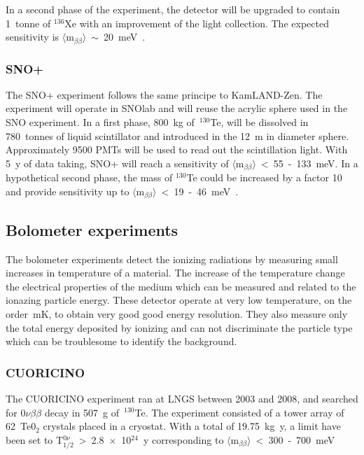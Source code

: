 \documentclass[main.tex]{subfiles}
\begin{document}
\NI In a second phase of the experiment, the detector will be upgraded to contain 1~tonne of $^{\text{136}}$Xe with an improvement of the light collection. The expected sensitivity is $\langle \text{m}_{\beta\beta} \rangle$~$\sim$~20~meV~\cite{KamLAND-Zen3}.


\FloatBarrier


\subsubsection{SNO+}


\NI The SNO+ experiment follows the same principe to KamLAND-Zen. The experiment will operate in SNOlab and will reuse the acrylic sphere used in the SNO experiment. In a first phase, 800~kg of~$^{\text{130}}$Te, will be dissolved in 780~tonnes of liquid scintillator and introduced in the 12~m in diameter sphere. Approximately 9500 PMTs will be used to read out the scintillation light. With 5~y of data taking, SNO+ will reach a sensitivity of $\langle \text{m}_{\beta\beta} \rangle$~<~55~-~133~meV. In a hypothetical second phase, the mass of $^{\text{130}}$Te could be increased by a factor 10 and provide sensitivity up to  $\langle \text{m}_{\beta\beta} \rangle$~<~19~-~46~meV~\cite{SNO+}.


\subsection{Bolometer experiments}


\NI The bolometer experiments detect the ionizing radiations by measuring small increases in temperature of a material. The increase of the temperature change the electrical properties of the medium which can be measured and related to the ionazing particle energy. These detector operate at very low temperature, on the order~mK, to obtain very good good energy resolution. They also measure only the total energy deposited by ionizing and can not discriminate the particle type which can be troublesome to identify the background. 


\subsubsection{CUORICINO}


\NI The CUORICINO experiment ran at LNGS between 2003 and 2008, and searched for 0$\nu\beta\beta$ decay in 507~g of~$^{\text{130}}$Te. The experiment consisted of a tower array of 62~Te0$_\text{2}$ crystals placed in a cryostat. With a total of 19.75~kg~y, a limit have been set to T$_{\text{1/2}}^{0\nu}$~>~2.8~$\times$~10$^{\text{24}}$~y corresponding to $\langle \text{m}_{\beta\beta} \rangle$~<~300~-~700~meV~\cite{CUORICINO}
\end{document}
